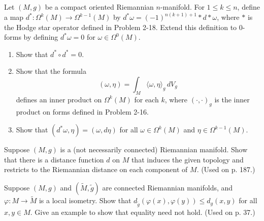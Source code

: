 \begin{exercise}
\label{prob:codifferential-operator}
Let $(M,g)$ be a compact oriented Riemannian $n$-manifold. For $1 \leq k \leq n$, define a map $d^* : \Omega^k(M) \to \Omega^{k-1}(M)$ by $d^* \omega = (-1)^{n(k+1)+1} * d * \omega$, where $*$ is the Hodge star operator defined in Problem 2-18. Extend this definition to 0-forms by defining $d^*\omega = 0$ for $\omega \in \Omega^0(M)$.

\begin{enumerate}
\item[(a)] Show that $d^* \circ d^* = 0$.
\item[(b)] Show that the formula
\[
(\omega, \eta) = \int_M \langle \omega, \eta \rangle_g \, dV_g
\]
defines an inner product on $\Omega^k(M)$ for each $k$, where $(\cdot, \cdot)_g$ is the inner product on forms defined in Problem 2-16.
\item[(c)] Show that $(d^*\omega, \eta) = (\omega, d\eta)$ for all $\omega \in \Omega^k(M)$ and $\eta \in \Omega^{k-1}(M)$.
\end{enumerate}
\end{exercise}

\begin{exercise}\label{prob:distance-disconnected-riemannian}
Suppose $(M,g)$ is a (not necessarily connected) Riemannian manifold. Show that there is a distance function $d$ on $M$ that induces the given topology and restricts to the Riemannian distance on each component of $M$. (Used on p. 187.)
\end{exercise}

\begin{exercise}\label{prob:local-isometry-distance}
\leanok
Suppose $(M,g)$ and $(\tilde{M}, \tilde{g})$ are connected Riemannian manifolds, and $\varphi: M \to \tilde{M}$ is a local isometry. Show that $d_{\tilde{g}}(\varphi(x), \varphi(y)) \leq d_g(x,y)$ for all $x, y \in M$. Give an example to show that equality need not hold. (Used on p. 37.)
\end{exercise}

